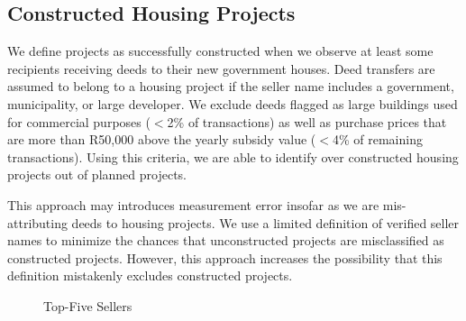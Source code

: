 \documentclass[12pt]{article}
\begin{document}

\subsection{Constructed Housing Projects}



We define projects as successfully constructed when we observe at least some recipients receiving deeds to their new government houses.  Deed transfers are assumed to belong to a housing project if the seller name includes a government, municipality, or large developer.  We exclude deeds flagged as large buildings used for commercial purposes ($<$2\% of transactions) as well as purchase prices that are more than R50,000 above the yearly subsidy value ($<$4\% of remaining transactions).  Using this criteria, we are able to identify over  constructed housing projects out of planned projects.

This approach may introduces measurement error insofar as we are mis-attributing deeds to housing projects.  We use a limited definition of verified seller names to minimize the chances that unconstructed projects are misclassified as constructed projects.  However, this approach increases the possibility that this definition mistakenly excludes constructed projects.

\begin{figure}
\caption{Top-Five Sellers}\label{figure:topfivesellers}
\centering

\end{figure}
\end{document}
